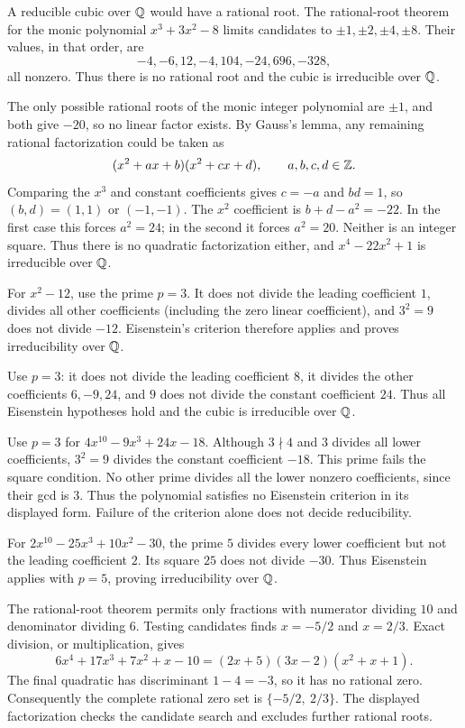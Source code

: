 A reducible cubic over $\mathbb{Q}$ would have a rational root. The rational-root theorem for the monic polynomial $x^3+3x^2-8$ limits candidates to $\pm1,\pm2,\pm4,\pm8$. Their values, in that order, are
\[-4,-6,12,-4,104,-24,696,-328,
\]
all nonzero. Thus there is no rational root and the cubic is irreducible over $\mathbb{Q}$.

The only possible rational roots of the monic integer polynomial are $\pm1$, and both give $-20$, so no linear factor exists. By Gauss's lemma, any remaining rational factorization could be taken as
\[(x^2+ax+b)(x^2+cx+d),\qquad a,b,c,d\in\mathbb{Z}.
\]
Comparing the $x^3$ and constant coefficients gives $c=-a$ and $bd=1$, so $(b,d)=(1,1)$ or $(-1,-1)$. The $x^2$ coefficient is $b+d-a^2=-22$. In the first case this forces $a^2=24$; in the second it forces $a^2=20$. Neither is an integer square. Thus there is no quadratic factorization either, and $x^4-22x^2+1$ is irreducible over $\mathbb{Q}$.

For $x^2-12$, use the prime $p=3$. It does not divide the leading coefficient $1$, divides all other coefficients (including the zero linear coefficient), and $3^2=9$ does not divide $-12$. Eisenstein's criterion therefore applies and proves irreducibility over $\mathbb{Q}$.

Use $p=3$: it does not divide the leading coefficient $8$, it divides the other coefficients $6,-9,24$, and $9$ does not divide the constant coefficient $24$. Thus all Eisenstein hypotheses hold and the cubic is irreducible over $\mathbb{Q}$.

Use $p=3$ for $4x^{10}-9x^3+24x-18$. Although $3\nmid4$ and $3$ divides all lower coefficients, $3^2=9$ divides the constant coefficient $-18$. This prime fails the square condition. No other prime divides all the lower nonzero coefficients, since their gcd is $3$. Thus the polynomial satisfies no Eisenstein criterion in its displayed form. Failure of the criterion alone does not decide reducibility.

For $2x^{10}-25x^3+10x^2-30$, the prime $5$ divides every lower coefficient but not the leading coefficient $2$. Its square $25$ does not divide $-30$. Thus Eisenstein applies with $p=5$, proving irreducibility over $\mathbb{Q}$.

The rational-root theorem permits only fractions with numerator dividing $10$ and denominator dividing $6$. Testing candidates finds $x=-5/2$ and $x=2/3$. Exact division, or multiplication, gives
\[6x^4+17x^3+7x^2+x-10=(2x+5)(3x-2)(x^2+x+1).
\]
The final quadratic has discriminant $1-4=-3$, so it has no rational zero. Consequently the complete rational zero set is $\boxed{\{-5/2,\ 2/3\}}$. The displayed factorization checks the candidate search and excludes further rational roots.

